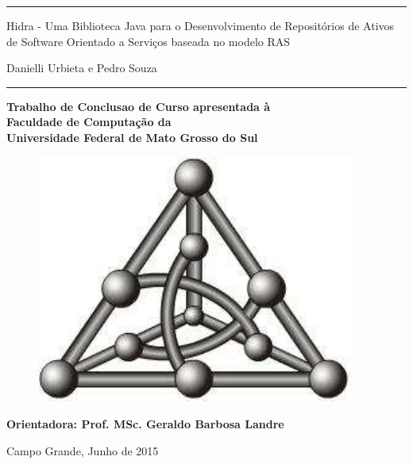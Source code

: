 
\begin{center}
\noindent \rule{\linewidth}{.1cm}

\vspace*{1cm}

{\LARGE \textsf{Hidra - Uma Biblioteca Java para o Desenvolvimento de Repositórios de Ativos de Software Orientado a Serviços baseada no modelo RAS}}

\vspace*{1cm}

{\Large \textsf{Danielli Urbieta e Pedro Souza}}

\vspace*{1cm}

\noindent \rule{\linewidth}{.1cm}

\vspace*{1cm}

{\large

\textbf{Trabalho de Conclusao de Curso apresentada à} \\
\textbf{Faculdade de Computa\c{c}\~{a}o da} \\
\textbf{Universidade Federal de Mato Grosso do Sul}

}

\vspace*{1cm}

\begin{figure}[htb]
\begin{center}
\includegraphics{images/grafo}
\end{center}
\end{figure}
\vspace{2 cm}

\textbf{Orientadora: Prof. MSc. Geraldo Barbosa Landre}


Campo Grande, Junho de 2015

\end{center}
